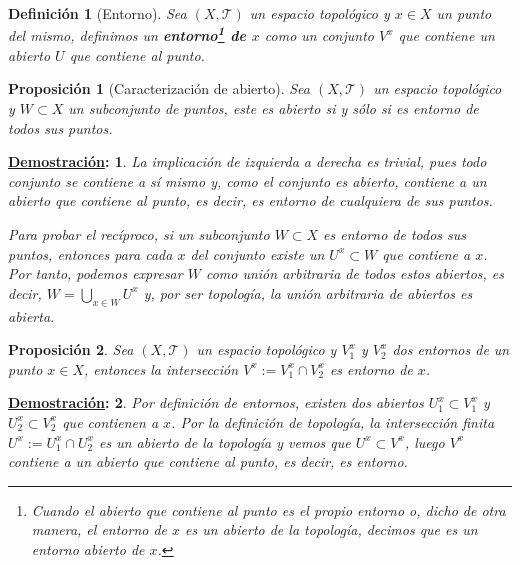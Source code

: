 \documentclass[10pt,a4paper,openright]{book}
\theoremstyle{break}
\newtheorem*{defi}{Definición}
\newtheorem*{prop}{Proposición}
\newtheorem*{demo}{\underline{Demostración}:}
\begin{document}
\begin{defi}[Entorno]
Sea $(X, \mathcal{T})$ un espacio topológico y $x\in X$ un punto del mismo, definimos un \textbf{entorno\footnote{Cuando el abierto que contiene al punto es el propio entorno o, dicho de otra manera, el entorno de $x$ es un abierto de la topología, decimos que es un entorno \textit{abierto} de $x$.} de $x$} como un conjunto $V^x$ que contiene un abierto $U$ que contiene al punto.
\end{defi}

\begin{prop}[Caracterización de abierto]
Sea $(X, \mathcal{T})$ un espacio topológico y $W \subset X$ un subconjunto de puntos, este es abierto si y sólo si es entorno de todos sus puntos.
\end{prop}
\begin{demo}
La implicación de izquierda a derecha es trivial, pues todo conjunto se contiene a sí mismo y, como el conjunto es abierto, contiene a un abierto que contiene al punto, es decir, es entorno de cualquiera de sus puntos.

Para probar el recíproco, si un subconjunto $W\subset X$ es entorno de todos sus puntos, entonces para cada $x$ del conjunto existe un $U^x\subset W$ que contiene a $x$. Por tanto, podemos expresar $W$ como unión arbitraria de todos estos abiertos, es decir, $W = \bigcup_{x\in W} U^x$ y, por ser topología, la unión arbitraria de abiertos es abierta.
\end{demo}

\begin{prop}
Sea $(X,\mathcal{T})$ un espacio topológico y $V_1^x$ y $V_2^x$ dos entornos de un punto $x\in X$, entonces la intersección $V^x := V_1^x\cap V_2^x$ es entorno de $x$.
\end{prop}
\begin{demo}
Por definición de entornos, existen dos abiertos $U_1^x\subset V_1^x$ y $U_2^x\subset V_2^x$ que contienen a $x$. Por la definición de topología, la intersección finita $U^x := U_1^x\cap U_2^x$ es un abierto de la topología y vemos que $U^x \subset V^x$, luego $V^x$ contiene a un abierto que contiene al punto, es decir, es entorno.
\end{demo}
\end{document}

